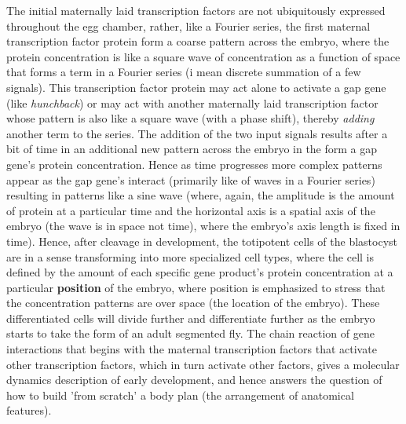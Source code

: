 The initial maternally laid transcription factors are not ubiquitously expressed throughout the egg chamber, rather, like a Fourier series, the first maternal transcription factor protein form a coarse pattern across the embryo, where the protein concentration is like a square wave of concentration as a function of space that forms a term in a Fourier series (i mean discrete summation of a few signals).  This transcription factor protein may act alone to activate a gap gene (like \textit{hunchback}) or may act with another maternally laid transcription factor whose pattern is also like a square wave (with a phase shift), thereby \textit{adding} another term to the series.  The addition of the two input signals results after a bit of time in an additional new pattern across the embryo in the form a gap gene's protein concentration.  Hence as time progresses more complex patterns appear as the gap gene's interact (primarily like  of waves in a Fourier series) resulting in patterns like a sine wave (where, again, the amplitude is the amount of protein at a particular time and the horizontal axis is a spatial axis of the embryo (the wave is in space not time), where the embryo's axis length is fixed in time).  Hence, after cleavage in development, the totipotent cells of the blastocyst are in a sense transforming into more specialized cell types, where the cell is defined by the amount of each specific gene product's protein concentration at a particular \textbf{position} of the embryo, where position is emphasized to stress that the concentration patterns are over space (the location of the embryo).  These differentiated cells will divide further and differentiate further as the embryo starts to take the form of an adult segmented fly.  The chain reaction of gene interactions that begins with the maternal transcription factors that activate other transcription factors, which in turn activate other factors, gives a molecular dynamics description of early development, and hence answers the question of how to build 'from scratch' a body plan (the arrangement of anatomical features).  


